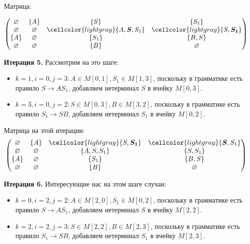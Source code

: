 \begin{example}
Матрица:

\[
\begin{pmatrix}
\varnothing & \{A\}       & \{S\}         & \{S_1\}     \\
\varnothing & \varnothing & \cellcolor{lightgray}\{A, \boldsymbol{S}, S_1\} & \cellcolor{lightgray}\{S, \boldsymbol{S_1}\}  \\
\{A\}       & \varnothing & \{S_1\}       & \{B, S\}    \\
\varnothing & \varnothing & \{B\}         & \varnothing \\
\end{pmatrix}
\]

\textbf{Итерация 5.}
Рассмотрим на это шаге:

\begin{itemize}
    \setlength\itemsep{1em}
    \item $k = 1, i = 0, j = 3: A \in M[0, 1], S_1 \in M[1, 3]$, поскольку в грамматике есть правило $S \to A S_1$, добавляем нетерминал $S$ в ячейку $M[0, 3]$.
    \item $k = 3, i = 0, j = 2: S \in M[0, 3], B \in M[3, 2]$, поскольку в грамматике есть правило $S_1 \to S B$, добавляем нетерминал $S_1$ в ячейку $M[0, 2]$.
\end{itemize}

Матрица на этой итерации:
\[
\begin{pmatrix}
\varnothing & \{A\}       & \cellcolor{lightgray}\{S, \boldsymbol{S_1}\}    & \cellcolor{lightgray}\{\boldsymbol{S}, S_1\}  \\
\varnothing & \varnothing & \{A, S, S_1\} & \{S, S_1\}  \\
\{A\}       & \varnothing & \{S_1\}       & \{B, S\}    \\
\varnothing & \varnothing & \{B\}         & \varnothing \\
\end{pmatrix}
\]

\textbf{Итерация 6.}
Интересующие нас на этом шаге случаи:

\begin{itemize}
    \setlength\itemsep{1em}
    \item $k = 0, i = 2, j = 2: A \in M[2, 0], S_1 \in M[0, 2]$, поскольку в грамматике есть правило $S \to A S_1$, добавляем нетерминал $S$ в ячейку $M[2, 2]$.
    \item $k = 2, i = 2, j = 3: S \in M[2, 2], B \in M[2, 3]$, поскольку в грамматике есть правило $S_1 \to S B$, добавляем нетерминал $S_1$ в ячейку $M[2, 3]$.
\end{itemize}


\end{example}
